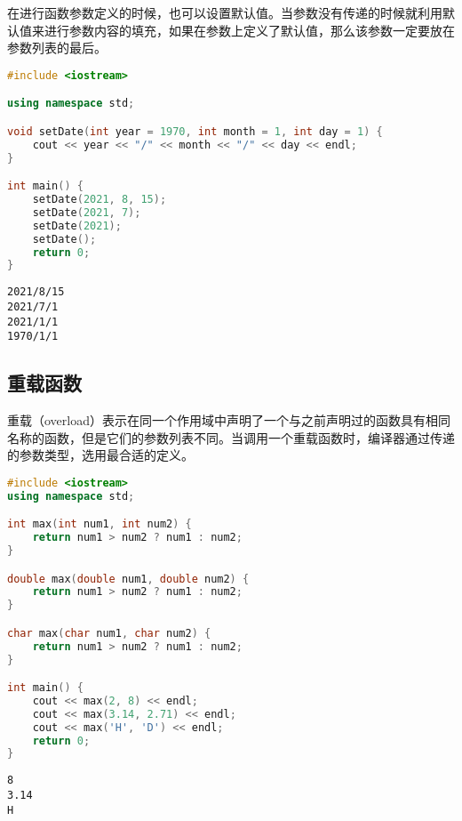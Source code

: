 在进行函数参数定义的时候，也可以设置默认值。当参数没有传递的时候就利用默认值来进行参数内容的填充，如果在参数上定义了默认值，那么该参数一定要放在参数列表的最后。\\


\begin{lstlisting}[language=C++]
#include <iostream>

using namespace std;

void setDate(int year = 1970, int month = 1, int day = 1) {
    cout << year << "/" << month << "/" << day << endl;
}

int main() {
    setDate(2021, 8, 15);
    setDate(2021, 7);
    setDate(2021);
    setDate();
    return 0;
}
\end{lstlisting}

\begin{tcolorbox}
	\begin{verbatim}
2021/8/15
2021/7/1
2021/1/1
1970/1/1
	\end{verbatim}
\end{tcolorbox}

\vspace{0.5cm}

\subsection{重载函数}

重载（overload）表示在同一个作用域中声明了一个与之前声明过的函数具有相同名称的函数，但是它们的参数列表不同。当调用一个重载函数时，编译器通过传递的参数类型，选用最合适的定义。\\


\begin{lstlisting}[language=C++]
#include <iostream>
using namespace std;

int max(int num1, int num2) {
    return num1 > num2 ? num1 : num2;
}

double max(double num1, double num2) {
    return num1 > num2 ? num1 : num2;
}

char max(char num1, char num2) {
    return num1 > num2 ? num1 : num2;
}

int main() {
    cout << max(2, 8) << endl;
    cout << max(3.14, 2.71) << endl;
    cout << max('H', 'D') << endl;
    return 0;
}
\end{lstlisting}

\begin{tcolorbox}
	\begin{verbatim}
8
3.14
H
	\end{verbatim}
\end{tcolorbox}

